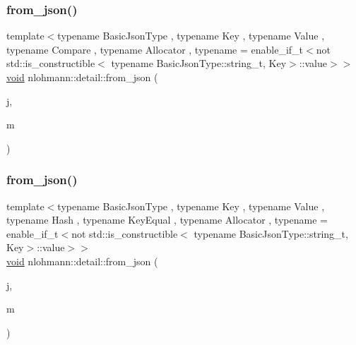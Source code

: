 \subsubsection{\texorpdfstring{from\+\_\+json()}{from\_json()}\hspace{0.1cm}{\footnotesize\ttfamily [17/18]}}
{\footnotesize\ttfamily template$<$typename Basic\+Json\+Type , typename Key , typename Value , typename Compare , typename Allocator , typename  = enable\+\_\+if\+\_\+t$<$not std\+::is\+\_\+constructible$<$                                     typename Basic\+Json\+Type\+::string\+\_\+t, Key$>$\+::value$>$$>$ \\
\hyperlink{namespacenlohmann_1_1detail_a59fca69799f6b9e366710cb9043aa77d}{void} nlohmann\+::detail\+::from\+\_\+json (\begin{DoxyParamCaption}\item[{const Basic\+Json\+Type \&}]{j,  }\item[{std\+::map$<$ Key, Value, Compare, Allocator $>$ \&}]{m }\end{DoxyParamCaption})}

\mbox{\label{namespacenlohmann_1_1detail_aef5c8ea108f4d2b03fb4a635617510de}} 
\subsubsection{\texorpdfstring{from\+\_\+json()}{from\_json()}\hspace{0.1cm}{\footnotesize\ttfamily [18/18]}}
{\footnotesize\ttfamily template$<$typename Basic\+Json\+Type , typename Key , typename Value , typename Hash , typename Key\+Equal , typename Allocator , typename  = enable\+\_\+if\+\_\+t$<$not std\+::is\+\_\+constructible$<$                                     typename Basic\+Json\+Type\+::string\+\_\+t, Key$>$\+::value$>$$>$ \\
\hyperlink{namespacenlohmann_1_1detail_a59fca69799f6b9e366710cb9043aa77d}{void} nlohmann\+::detail\+::from\+\_\+json (\begin{DoxyParamCaption}\item[{const Basic\+Json\+Type \&}]{j,  }\item[{std\+::unordered\+\_\+map$<$ Key, Value, Hash, Key\+Equal, Allocator $>$ \&}]{m }\end{DoxyParamCaption})}


